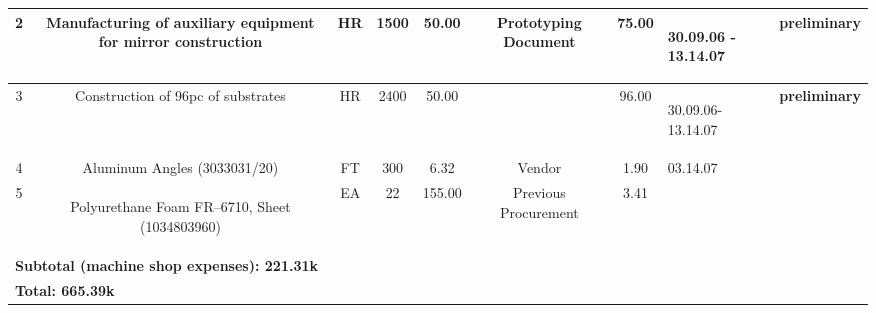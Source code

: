 \begin{table}
\begin{tabular}{|c|c|c|c|c|c|c|p{1.5cm}|p{2.2cm}|}
2 & \begin{minipage}[c]{0.2\textwidth} Manufacturing of auxiliary equipment for mirror construction \end{minipage} & HR & 1500 & 50.00 &\begin{minipage}[c]{0.12\textwidth}  Prototyping Document \end{minipage} & 75.00 & \begin{minipage}[r]{1.5cm} \begin{center} 30.09.06 - 13.14.07 \end{center} \end{minipage} &\begin{minipage}[c]{2.2cm}  {\bf preliminary}  \end{minipage} \\ \hline 
3 & \begin{minipage}[c]{0.2\textwidth} Construction of  96pc of substrates \end{minipage}  & HR & 2400 & 50.00 & & 96.00 & \begin{minipage}[r]{1.5cm} \begin{center} 30.09.06-13.14.07 \end{center} \end{minipage} & \begin{minipage}[c]{2.2cm}  {\bf preliminary}  \end{minipage} \\ \hline 
4 & \begin{minipage}[c]{0.2\textwidth} Aluminum Angles (3033031/20)\end{minipage}  & FT & 300 & 6.32 & Vendor & 1.90 & 03.14.07 &  \\ \hline
5 & \begin{minipage}[c]{0.2\textwidth} \begin{center} Polyurethane  Foam FR--6710, Sheet (1034803960) \end{center}\end{minipage} & EA & 22 & 155.00 & \begin{minipage}[c]{0.12\textwidth} Previous Procurement \end{minipage} & 3.41 & & \\ \hline
\multicolumn{9}{|l|}{ \bf \hspace{0.5cm} Subtotal (machine shop expenses): \hspace{2.6cm} 221.31k }  \\ \hline
\multicolumn{9}{|l|}{ \bf \hspace{0.5cm} Total: \hspace{8.6cm} 665.39k }  \\ \hline
\end{tabular}
\end{table}

